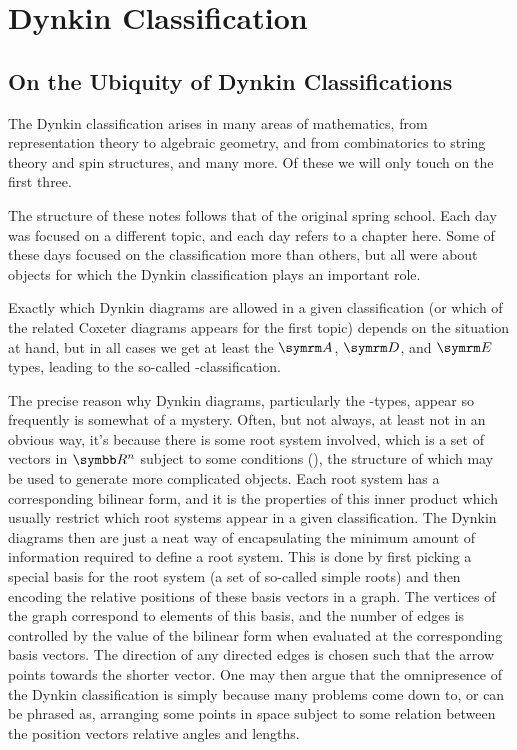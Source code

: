 \addtocounter{chapter}{-1}
\chapter{Dynkin Classification}
\section{On the Ubiquity of Dynkin Classifications}
The Dynkin classification arises in many areas of mathematics, from representation theory to algebraic geometry, and from combinatorics to string theory and spin structures, and many more.
Of these we will only touch on the first three.

The structure of these notes follows that of the original spring school.
Each day was focused on a different topic, and each day refers to a chapter here.
Some of these days focused on the classification more than others, but all were about objects for which the Dynkin classification plays an important role.

Exactly which Dynkin diagrams are allowed in a given classification (or which of the related Coxeter diagrams appears for the first topic) depends on the situation at hand, but in all cases we get at least the \(\A\), \(\D\), and \(\E\) types, leading to the so-called \ADE-classification.

The precise reason why Dynkin diagrams, particularly the \ADE-types, appear so frequently is somewhat of a mystery.
Often, but not always, at least not in an obvious way, it's because there is some root system involved, which is a set of vectors in \(\reals^n\) subject to some conditions (), the structure of which may be used to generate more complicated objects.
Each root system has a corresponding bilinear form, and it is the properties of this inner product which usually restrict which root systems appear in a given classification.
The Dynkin diagrams then are just a neat way of encapsulating the minimum amount of information required to define a root system.
This is done by first picking a special basis for the root system (a set of so-called simple roots) and then encoding the relative positions of these basis vectors in a graph.
The vertices of the graph correspond to elements of this basis, and the number of edges is controlled by the value of the bilinear form when evaluated at the corresponding basis vectors.
The direction of any directed edges is chosen such that the arrow points towards the shorter vector.
One may then argue that the omnipresence of the Dynkin classification is simply because many problems come down to, or can be phrased as, arranging some points in space subject to some relation between the position vectors relative angles and lengths.

